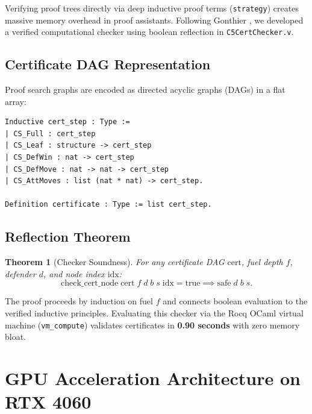 \documentclass[11pt,reqno]{amsart}
\theoremstyle{plain}
\newtheorem{theorem}{Theorem}[section]
\theoremstyle{definition}
\theoremstyle{remark}
\begin{document}
Verifying proof trees directly via deep inductive proof terms (\texttt{strategy}) creates massive memory overhead in proof assistants. Following Gonthier \cite{gonthier2008formal}, we developed a verified computational checker using boolean reflection in \texttt{C5CertChecker.v}.

\subsection{Certificate DAG Representation}
Proof search graphs are encoded as directed acyclic graphs (DAGs) in a flat array:
\begin{lstlisting}[language=Coq]
Inductive cert_step : Type :=
| CS_Full : cert_step
| CS_Leaf : structure -> cert_step
| CS_DefWin : nat -> cert_step
| CS_DefMove : nat -> nat -> cert_step
| CS_AttMoves : list (nat * nat) -> cert_step.

Definition certificate : Type := list cert_step.
\end{lstlisting}

\subsection{Reflection Theorem}
\begin{theorem}[Checker Soundness]
\label{thm:cert_sound}
For any certificate DAG $\text{cert}$, fuel depth $f$, defender $d$, and node index $\text{idx}$:
$$\text{check\_cert\_node}\;\text{cert}\;f\;d\;b\;s\;\text{idx} = \text{true} \implies \text{safe}\;d\;b\;s.$$
\end{theorem}
The proof proceeds by induction on fuel $f$ and connects boolean evaluation to the verified inductive principles. Evaluating this checker via the Rocq OCaml virtual machine (\texttt{vm\_compute}) validates certificates in \textbf{0.90 seconds} with zero memory bloat.

\section{GPU Acceleration Architecture on RTX 4060}
\end{document}
